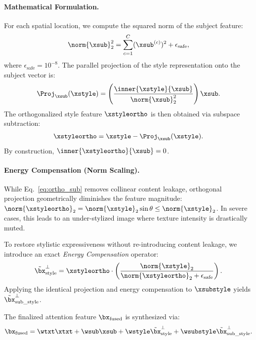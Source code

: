 \paragraph{Mathematical Formulation.}
For each spatial location, we compute the squared norm of the subject feature:
\begin{equation}
    \norm{\xsub}_2^2 = \sum_{c=1}^C (\xsub^{(c)})^2 + \epsilon_{\text{safe}},
\end{equation}
where $\epsilon_{\text{safe}} = 10^{-8}$. The parallel projection of the style representation onto the subject vector is:
\begin{equation}
    \Proj_{\xsub}(\xstyle) = \left( \frac{\inner{\xstyle}{\xsub}}{\norm{\xsub}_2^2} \right) \xsub.
\end{equation}
The orthogonalized style feature $\xstyleortho$ is then obtained via subspace subtraction:
\begin{equation}
    \xstyleortho = \xstyle - \Proj_{\xsub}(\xstyle).
    \label{eq:ortho_sub}
\end{equation}
By construction, $\inner{\xstyleortho}{\xsub} = 0$.

\paragraph{Energy Compensation (Norm Scaling).}
While Eq.~\eqref{eq:ortho_sub} removes collinear content leakage, orthogonal projection geometrically diminishes the feature magnitude: $\norm{\xstyleortho}_2 = \norm{\xstyle}_2 \sin \theta \le \norm{\xstyle}_2$. In severe cases, this leads to an under-stylized image where texture intensity is drastically muted.

To restore stylistic expressiveness without re-introducing content leakage, we introduce an exact \textit{Energy Compensation} operator:
\begin{equation}
    \tilde{\bx}_{\text{style}}^\perp = \xstyleortho \cdot \left( \frac{\norm{\xstyle}_2}{\norm{\xstyleortho}_2 + \epsilon_{\text{safe}}} \right).
    \label{eq:energy_comp}
\end{equation}
Applying the identical projection and energy compensation to $\xsubstyle$ yields $\tilde{\bx}_{\text{sub\_style}}^\perp$. 

The finalized attention feature $\bx_{\text{fused}}$ is synthesized via:
\begin{equation}
    \bx_{\text{fused}} = \wtxt \xtxt + \wsub \xsub + \wstyle \tilde{\bx}_{\text{style}}^\perp + \wsubstyle \tilde{\bx}_{\text{sub\_style}}^\perp.
    \label{eq:attn_synthesis}
\end{equation}


